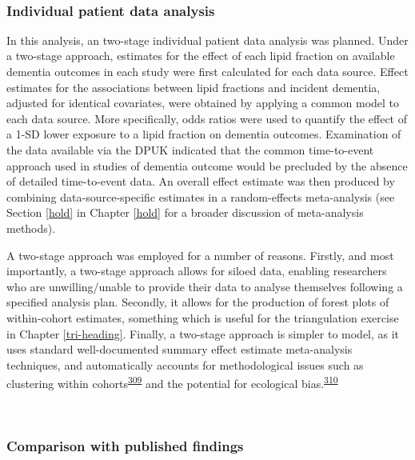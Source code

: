\documentclass[a4paper, twoside]{templates/ociamthesis}
\begin{document}
~

\hypertarget{individual-patient-data-analysis}{%
\subsubsection{Individual patient data analysis}\label{individual-patient-data-analysis}}

In this analysis, an two-stage individual patient data analysis was planned. Under a two-stage approach, estimates for the effect of each lipid fraction on available dementia outcomes in each study were first calculated for each data source. Effect estimates for the associations between lipid fractions and incident dementia, adjusted for identical covariates, were obtained by applying a common model to each data source. More specifically, odds ratios were used to quantify the effect of a 1-SD lower exposure to a lipid fraction on dementia outcomes. Examination of the data available via the DPUK indicated that the common time-to-event approach used in studies of dementia outcome would be precluded by the absence of detailed time-to-event data. An overall effect estimate was then produced by combining data-source-specific estimates in a random-effects meta-analysis (see Section \ref{hold} in Chapter \ref{hold} for a broader discussion of meta-analysis methods).

A two-stage approach was employed for a number of reasons. Firstly, and most importantly, a two-stage approach allows for siloed data, enabling researchers who are unwilling/unable to provide their data to analyse themselves following a specified analysis plan. Secondly, it allows for the production of forest plots of within-cohort estimates, something which is useful for the triangulation exercise in Chapter \ref{tri-heading}. Finally, a two-stage approach is simpler to model, as it uses standard well-documented summary effect estimate meta-analysis techniques, and automatically accounts for methodological issues such as clustering within cohorts\textsuperscript{\protect\hyperlink{ref-abo-zaid2013}{309}} and the potential for ecological bias.\textsuperscript{\protect\hyperlink{ref-burke2017}{310}}

~

\hypertarget{comparison-with-published-findings}{%
\subsubsection{Comparison with published findings}\label{comparison-with-published-findings}}
\end{document}
